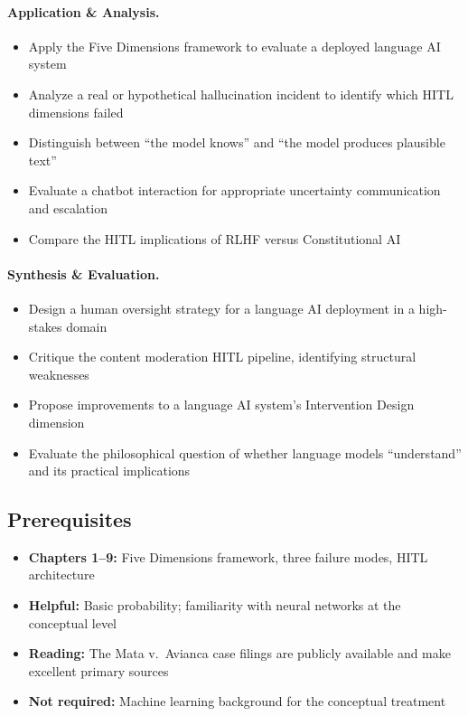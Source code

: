 \paragraph{Application \& Analysis.}
\begin{itemize}
    \item Apply the Five Dimensions framework to evaluate a deployed language AI system
    \item Analyze a real or hypothetical hallucination incident to identify which HITL dimensions failed
    \item Distinguish between ``the model knows'' and ``the model produces plausible text''
    \item Evaluate a chatbot interaction for appropriate uncertainty communication and escalation
    \item Compare the HITL implications of RLHF versus Constitutional AI
\end{itemize}

\paragraph{Synthesis \& Evaluation.}
\begin{itemize}
    \item Design a human oversight strategy for a language AI deployment in a high-stakes domain
    \item Critique the content moderation HITL pipeline, identifying structural weaknesses
    \item Propose improvements to a language AI system's Intervention Design dimension
    \item Evaluate the philosophical question of whether language models ``understand'' and its practical implications
\end{itemize}

\subsection{Prerequisites}
\begin{itemize}
    \item \textbf{Chapters 1--9:} Five Dimensions framework, three failure modes, HITL architecture
    \item \textbf{Helpful:} Basic probability; familiarity with neural networks at the conceptual level
    \item \textbf{Reading:} The Mata v.\ Avianca case filings are publicly available and make excellent primary sources
    \item \textbf{Not required:} Machine learning background for the conceptual treatment
\end{itemize}

